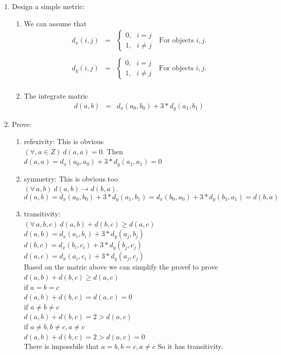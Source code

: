 \documentclass{article}
\begin{document}
 \begin{enumerate}
 	\item Design a simple metric:
 	\begin{enumerate}
 		\item We can assume that\\ 
 		\begin{eqnarray}
 	d_x(i,j) &=& \left\{\begin{array}{l} 0,\ \ \ i = j \\ 1,\ \ \  i\neq j \end{array}\right.\ \ \ \mbox{For objects $i,j$}. \\
 		\end{eqnarray}
	 		\begin{eqnarray}
 			d_y(i,j) &=& \left\{\begin{array}{l} 0,\ \ \ i = j \\ 1,\ \ \  i\neq j \end{array}\right.\ \ \ \mbox{For objects $i,j$}. \\
 			\end{eqnarray}
 		\item The integrate matric
 		\begin{eqnarray*}
 			d(a,b) &=& d_x(a_0,b_0) + 3 * d_y(a_1,b_1)
 		\end{eqnarray*}
 		
 	\end{enumerate}
 	\item Prove:
 	\begin{enumerate}
 		\item refexivity: This is obvious\\
 		$(\forall, a \in Z)\ d(a,a) = 0$.  Then $d(a,a) = d_x(a_0,a_0) + 3 * d_y(a_1,a_1) = 0$  
 		\item symmetry: This is obvious too\\
 		$(\forall\, a, b)\ d(a,b) \rightarrow d(b,a)$.    
 		\[ d(a,b) = d_x(a_0,b_0) + 3 * d_y(a_1,b_1) = d_x(b_0,a_0) + 3 * d_y(b_1,a_1) = d(b,a) \]
 		\item transitivity:\\
 		$(\forall\, a,b,c)\ d(a,b) + d(b,c) \geq d(a,c)$\\
	 	$d(a,b) = d_x(a_i,b_i) + 3 * d_y(a_j,b_j) $\\
	 	$d(b,c) = d_x(b_i,c_i) + 3 * d_y(b_j,c_j) $\\
	 	$d(a,c) = d_x(a_i,c_i) + 3 * d_y(a_j,c_j) $\\
	 	Based on the matric above we can simplify the provef to prove\\ $d(a,b) + d(b,c) \geq d(a,c)$\\
	 	if $a = b = c$\\
	 	$d(a,b) + d(b,c) = d(a,c) =  0$\\
	 	if $a \neq b \neq c$\\
	 	$d(a,b) + d(b,c ) = 2 > d(a,c)$ \\
	 	if $a \neq b, b\neq c, a\neq c$\\
	 	$d(a,b) + d(b,c) = 2 > d(a,c)= 0$\\
		There is impossbile that $a = b, b = c, a \neq c$ 
		So it has transitivity.
 	\end{enumerate}
 \end{enumerate}
\end{document}
